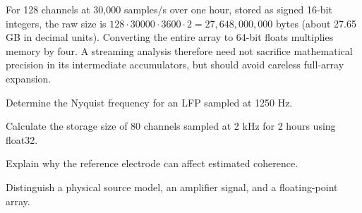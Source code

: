 \begin{workedexample}
For 128 channels at 30,000 samples/s over one hour, stored as signed 16-bit integers, the raw size is $128\cdot30000\cdot3600\cdot2=27{,}648{,}000{,}000$ bytes (about 27.65 GB in decimal units). Converting the entire array to 64-bit floats multiplies memory by four. A streaming analysis therefore need not sacrifice mathematical precision in its intermediate accumulators, but should avoid careless full-array expansion.
\end{workedexample}
\begin{exercises}
\item Determine the Nyquist frequency for an LFP sampled at 1250 Hz.
\item Calculate the storage size of 80 channels sampled at 2 kHz for 2 hours using float32.
\item Explain why the reference electrode can affect estimated coherence.
\item Distinguish a physical source model, an amplifier signal, and a floating-point array.
\end{exercises}